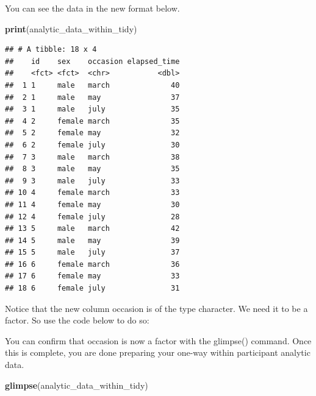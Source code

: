 \documentclass[
]{krantz}
\makeatletter
\newenvironment{Shaded}{\begin{snugshade}}{\end{snugshade}}
\newcommand{\DataTypeTok}[1]{\textcolor[rgb]{0.27,0.27,0.27}{#1}}
\newcommand{\KeywordTok}[1]{\textcolor[rgb]{0.27,0.27,0.27}{\textbf{#1}}}
\newcommand{\NormalTok}[1]{#1}
\newcommand{\OperatorTok}[1]{\textcolor[rgb]{0.43,0.43,0.43}{\textbf{#1}}}
\newcommand{\StringTok}[1]{\textcolor[rgb]{0.5,0.5,0.5}{#1}}
\newenvironment{kframe}{%
\medskip{}
\setlength{\fboxsep}{.8em}
 \def\at@end@of@kframe{}%
 \ifinner\ifhmode%
  \def\at@end@of@kframe{\end{minipage}}%
  \begin{minipage}{\columnwidth}%
 \fi\fi%
 \def\FrameCommand##1{\hskip\@totalleftmargin \hskip-\fboxsep
 \colorbox{shadecolor}{##1}\hskip-\fboxsep
     \hskip-\linewidth \hskip-\@totalleftmargin \hskip\columnwidth}%
 \MakeFramed {\advance\hsize-\width
   \@totalleftmargin\z@ \linewidth\hsize
   \@setminipage}}%
 {\par\unskip\endMakeFramed%
 \at@end@of@kframe}
\renewenvironment{Shaded}{\begin{kframe}}{\end{kframe}}
\makeatother
\begin{document}
You can see the data in the new format below.

\begin{Shaded}
\begin{Highlighting}[]
\KeywordTok{print}\NormalTok{(analytic_data_within_tidy)}
\end{Highlighting}
\end{Shaded}

\begin{verbatim}
## # A tibble: 18 x 4
##    id    sex    occasion elapsed_time
##    <fct> <fct>  <chr>           <dbl>
##  1 1     male   march              40
##  2 1     male   may                37
##  3 1     male   july               35
##  4 2     female march              35
##  5 2     female may                32
##  6 2     female july               30
##  7 3     male   march              38
##  8 3     male   may                35
##  9 3     male   july               33
## 10 4     female march              33
## 11 4     female may                30
## 12 4     female july               28
## 13 5     male   march              42
## 14 5     male   may                39
## 15 5     male   july               37
## 16 6     female march              36
## 17 6     female may                33
## 18 6     female july               31
\end{verbatim}

Notice that the new column occasion is of the type character. We need it to be a factor. So use the code below to do so:

\begin{Shaded}
\end{Shaded}

You can confirm that occasion is now a factor with the glimpse() command. Once this is complete, you are done preparing your one-way within participant analytic data.

\begin{Shaded}
\begin{Highlighting}[]
\KeywordTok{glimpse}\NormalTok{(analytic_data_within_tidy)}
\end{Highlighting}
\end{Shaded}
\end{document}

